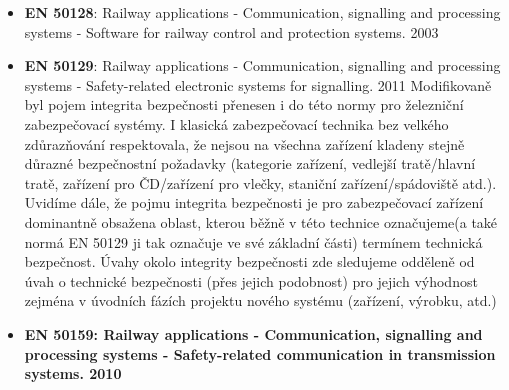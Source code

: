 {\begin{itemize}
              naléhavost požadavků na bezpečnost funkce jednotlivých železničních systémů je různá
              a lze je tedy splňovat s různou pravděpodobností jejich selhání. Také zavádí pojem
              \emph{integrita bezpečnosti (safety integrity - celistvost, úplnost, neporušenost
              bezpečnosti)}, který definuje jako pravděpodobnost, s níž systém uspokojivě splní
              požadované bezpečnostní funkce, za všech stanovených podmínek a ve stanoveném časovém
              období. Jde o to, do jaké míry může být pro bezpečnost relevantní funkce narušena
              např. poruchami vlastního zařízení, omyly obsluhy, vnějším rušením atd.
        \item \textbf{EN 50128}: Railway applications - Communication, signalling and processing
              systems - Software for railway control and protection systems. 2003          
        \item \textbf{EN 50129}: Railway applications - Communication, signalling and processing
              systems - Safety-related electronic systems for signalling. 2011
              Modifikovaně byl pojem integrita bezpečnosti přenesen i do této normy pro železniční
              zabezpečovací systémy. I klasická zabezpečovací technika bez velkého zdůrazňování
              respektovala, že nejsou na všechna zařízení kladeny stejně důrazné bezpečnostní
              požadavky (kategorie zařízení, vedlejší tratě/hlavní tratě, zařízení pro ČD/zařízení
              pro vlečky, staniční zařízení/spádoviště atd.). Uvidíme dále, že pojmu integrita
              bezpečnosti je pro zabezpečovací zařízení dominantně obsažena oblast, kterou běžně v
              této technice označujeme(a také normá EN 50129 ji tak označuje ve své základní části)
              termínem technická bezpečnost. Úvahy okolo integrity bezpečnosti zde sledujeme
              odděleně od úvah o technické bezpečnosti (přes jejich podobnost) pro jejich výhodnost
              zejména v úvodních fázích projektu nového systému (zařízení, výrobku, atd.)
        \item \textbf{EN 50159: Railway applications - Communication, signalling and processing
              systems - Safety-related communication in transmission systems. 2010}            
      \end{itemize}
    
}
